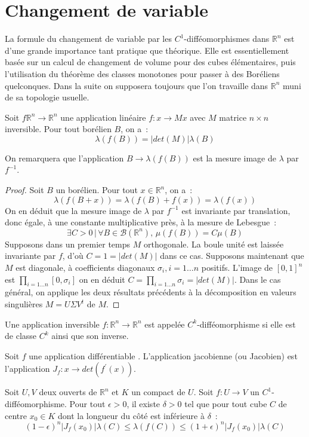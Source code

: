 \section{Changement de variable}

La formule du changement de variable par les $C^1$-difféomorphismes 
dans $\mathbb{R}^n$ est d'une grande importance tant pratique que
théorique. 
Elle est essentiellement basée sur un calcul de
changement de volume pour des cubes élémentaires, puis l'utilisation
du théorème des classes monotones pour passer à des Boréliens
quelconques.
Dans la suite on supposera toujours que l'on travaille dans
$\mathbb{R}^n$ muni de sa topologie usuelle.
\begin{prop}
Soit $f \mathbb{R}^n \to \mathbb{R}^n$ une application linéaire $f : x
\to M x$ avec $M$ matrice $n \times n$ inversible. Pour tout borélien
$B$, on a~:
\[ 
\lambda(f(B)) = |det(M)| \lambda(B)
\]
\end{prop}
On remarquera que l'application $B \to \lambda(f(B))$ est la mesure
image de $\lambda$ par $f^{-1}$.
\begin{proof}
Soit $B$ un borélien. Pour tout $x \in \mathbb{R}^n$, on a~:
\[
\lambda(f(B + x)) = \lambda(f(B) + f(x)) = \lambda(f(x))
\]
On en déduit que la mesure image de $\lambda$ par $f^{-1}$ est
invariante par translation, donc égale, à une constante multiplicative
près, à la mesure de Lebesgue~:
\[
\exists C >0 \, | \, \forall B \in \mathcal{B}(\mathbb{R}^n), \, \mu(f(B)) = C \mu(B)
\]
Supposons dans un premier temps $M$ orthogonale. La boule unité est
laissée invariante par $f$, d'où $C = 1 = |det(M)|$ dans ce cas. Supposons
maintenant que $M$ est diagonale, à coefficients diagonaux $\sigma_i,
i=1\dots n$ positifs. L'image de $[0,1]^n$ est $\prod_{i=1\dots n}
[0, \sigma_i]$ on en déduit $C = \prod_{i=1\dots n} \sigma_i =
|det(M)|$. Dans le cas général, on applique les deux résultats
précédents à la décomposition en valeurs singulières $M = U \Sigma
V^t$ de $M$.
\end{proof}
\begin{defn}
Une application inversible $f : \mathbb{R}^n \to \mathbb{R}^n$ est
appelée $C^k$-difféomorphisme si elle est de classe $C^k$ ainsi que
son inverse.
\end{defn}
\begin{term}
Soit $f$ une application différentiable . L'application
jacobienne (ou Jacobien) est l'application $J_f : x \to det(f^\prime(x))$. 
\end{term}
\begin{prop}
Soit $U,V$ deux ouverts de $\mathbb{R}^n$ et $K$ un compact de $U$. Soit $f : U \to V$ un
$C^1$-difféomorphisme. Pour tout $\epsilon > 0$, il existe $\delta >
0$ tel que pour tout cube $C$ de centre $x_0 \in K$ dont la longueur du
côté est inférieure à $\delta$~:
\[
(1-\epsilon)^n |J_f(x_0)| \lambda(C) \leq \lambda(f(C)) \leq (1+\epsilon)^n
|J_f(x_0)| \lambda(C)
\]
\end{prop}
